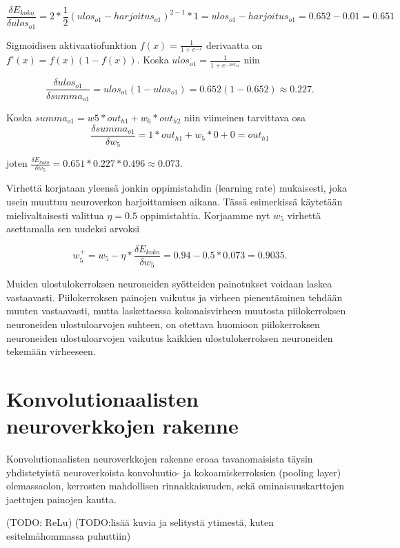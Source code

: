 \documentclass[finnish]{tktltiki2}
\theoremstyle{definition}
\theoremstyle{remark}
\begin{document}
  $$ \frac{\delta E_{koko}}{\delta ulos_{o1}} = 2 * \frac{1}{2} (ulos_{o1} - harjoitus_{o1})^{2-1} * 1 = ulos_{o1} - harjoitus_{o1} = 0.652 - 0.01 = 0.651$$

  Sigmoidisen aktivaatiofunktion $ f(x) = \frac{1}{1 + e^{-x}}$ derivaatta on $f'(x) = f(x)(1 - f(x))$.
  Koska $ ulos_{o1} = \frac{1}{1+e^{-net_{o1}}} $ niin

  $$ \frac{\delta ulos_{o1}}{\delta summa_{o1}} = ulos_{o1}(1 - ulos_{o1}) = 0.652(1 - 0.652) \approx 0.227.$$

  Koska $ summa_{o1} = w5 * out_{h1} + w_6 * out_{h2} $ niin viimeinen tarvittava osa 
  $$ \frac{\delta summa_{o1}}{\delta w_5} = 1 * out_{h1} + w_5 * 0 + 0 = out_{h1} $$ 

  joten $\frac{\delta E_{koko}}{\delta w_5} = 0.651 * 0.227 * 0.496 \approx 0.073 $.

  Virhettä korjataan yleensä jonkin oppimistahdin (learning rate) mukaisesti, joka usein muuttuu neuroverkon harjoittamisen aikana. Tässä esimerkissä käytetään mielivaltaisesti valittua $\eta = 0.5$ oppimistahtia. Korjaamme nyt $w_5$ virhettä asettamalla sen uudeksi arvoksi

  $$w_{5}^+ = w_5 - \eta * \frac{\delta E_{koko}}{\delta w_5} = 0.94 - 0.5 * 0.073 = 0.9035.$$

  Muiden ulostulokerroksen neuroneiden syötteiden painotukset voidaan laskea vastaavasti. Piilokerroksen painojen vaikutus ja virheen pienentäminen tehdään muuten vastaavasti, mutta laskettaessa kokonaisvirheen muutosta piilokerroksen neuroneiden ulostuloarvojen suhteen, on otettava huomioon piilokerroksen neuroneiden ulostuloarvojen vaikutus kaikkien ulostulokerroksen neuroneiden tekemään virheeseen.



  
  \section{Konvolutionaalisten neuroverkkojen rakenne}
    Konvolutionaalisten neuroverkkojen rakenne eroaa tavanomaisista täysin yhdistetyistä neuroverkoista konvoluutio- ja kokoamiskerroksien (pooling layer) olemassaolon, kerrosten mahdollisen rinnakkaisuuden, sekä ominaisuuskarttojen jaettujen painojen kautta.   
    
    (TODO: ReLu)
    (TODO:lisää kuvia ja selitystä ytimestä, kuten esitelmähommassa puhuttiin)
\end{document}
